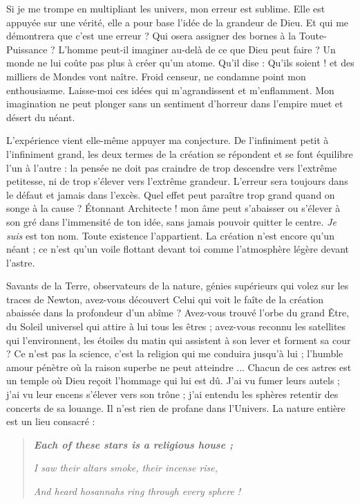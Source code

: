 \documentclass[a4paper, 11pt, oneside, landscape]{article}
\begin{document}
Si je me trompe en multipliant les univers, mon erreur est sublime. Elle est appuyée sur une vérité, elle a pour base l'idée de la grandeur de Dieu. Et qui me démontrera que c'est une erreur ? Qui osera assigner des bornes à la Toute-Puissance ? L'homme peut-il imaginer au-delà de ce que Dieu peut faire ? Un monde ne lui coûte pas plus à créer qu'un atome. Qu'il dise : Qu'ils soient ! et des milliers de Mondes vont naître. Froid censeur, ne condamne point mon enthousiasme. Laisse-moi ces idées qui m'agrandissent et m'enflamment. Mon imagination ne peut plonger sans un sentiment d'horreur dans l'empire muet et désert du néant.

L'expérience vient elle-même appuyer ma conjecture. De l'infiniment petit à l'infiniment grand, les deux termes de la création se répondent et se font équilibre l'un à l'autre : la pensée ne doit pas craindre de trop descendre vers l'extrême petitesse, ni de trop s'élever vers l'extrême grandeur. L'erreur sera toujours dans le défaut et jamais dans l'excès. Quel effet peut paraître trop grand quand on songe à la cause ? Étonnant Architecte ! mon âme peut s'abaisser ou s'élever à son gré dans l'immensité de ton idée, sans jamais pouvoir quitter le centre. \emph{Je suis} est ton nom. Toute existence l'appartient. La création n'est encore qu'un néant ; ce n'est qu'un voile flottant devant toi comme l'atmosphère légère devant l'astre.

Savants de la Terre, observateurs de la nature, génies supérieurs qui volez sur les traces de Newton, avez-vous découvert Celui qui voit le faîte de la création abaissée dans la profondeur d'un abîme ? Avez-vous trouvé l'orbe du grand Être, du Soleil universel qui attire à lui tous les êtres ; avez-vous reconnu les satellites qui l'environnent, les étoiles du matin qui assistent à son lever et forment sa cour ? Ce n'est pas la science, c'est la religion qui me conduira jusqu'à lui ; l'humble amour pénètre où la raison superbe ne peut atteindre ... Chacun de ces astres est un temple où Dieu reçoit l'hommage qui lui est dû. J'ai vu fumer leurs autels ; j'ai vu leur encens s'élever vers son trône ; j'ai entendu les sphères retentir des concerts de sa louange. Il n'est rien de profane dans l'Univers. La nature entière est un lieu consacré :
\begin{quotation}\bfseries\small
\emph{Each of these stars is a religious house ;}

\emph{I saw their altars smoke, their incense rise,}

\emph{And heard hosannahs ring through every sphere !}
\end{quotation}
\end{document}
